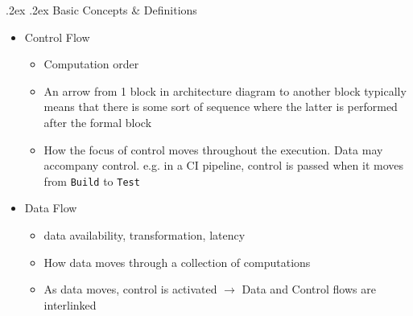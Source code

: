 \documentclass[10pt,landscape,a4paper]{article}
\makeatletter
\renewcommand{\subsection}{\@startsection{subsection}{1}{0mm}%
	{.2ex}%
	{.2ex}%
	{\sffamily\bfseries}}
\makeatother
\begin{document}
\begin{multicols*}{4}
		\subsection{Basic Concepts \& Definitions}
		\begin{itemize}
			\item Control Flow
			\begin{itemize}
				\item Computation order
				\item An arrow from 1 block in architecture diagram to another block typically means that there is some sort of sequence where the latter is performed after the formal block
				\item How the focus of control moves throughout the execution. Data may accompany control. e.g. in a CI pipeline, control is passed when it moves from \texttt{Build}  to \texttt{Test}
			\end{itemize}
			\item Data Flow
			\begin{itemize}
				\item data availability, transformation, latency
				\item How data moves through a collection of computations
				\item As data moves, control is activated $\rightarrow$ Data and Control flows are interlinked
			\end{itemize}
		\end{itemize}

\end{multicols*}
\end{document}
